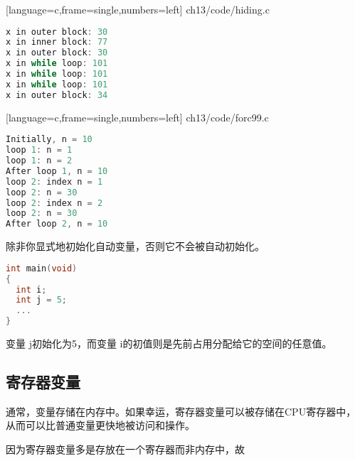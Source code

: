 \begin{frame}\ft{\subsecname}

[language=c,frame=single,numbers=left]
{ch13/code/hiding.c}
\end{frame}

\begin{frame}[fragile]\ft{\subsecname}
  \begin{lstlisting}[language=c,frame=single]
x in outer block: 30
x in inner block: 77
x in outer block: 30
x in while loop: 101
x in while loop: 101
x in while loop: 101
x in outer block: 34  
  \end{lstlisting}
\end{frame}

\begin{frame}\ft{\subsecname}

[language=c,frame=single,numbers=left]
{ch13/code/forc99.c}

\end{frame}

\begin{frame}[fragile]\ft{\subsecname}
  \begin{lstlisting}[language=c,frame=single]
Initially, n = 10
loop 1: n = 1
loop 1: n = 2
After loop 1, n = 10
loop 2: index n = 1
loop 2: n = 30
loop 2: index n = 2
loop 2: n = 30
After loop 2, n = 10
  \end{lstlisting}
\end{frame}

\begin{frame}[fragile]
除非你显式地初始化自动变量，否则它不会被自动初始化。
\begin{lstlisting}[language=c,frame=single]
int main(void)
{
  int i;
  int j = 5;
  ...
}  
\end{lstlisting}
变量{ j}初始化为5，而变量{ i}的初值则是先前占用分配给它的空间的任意值。
\end{frame}


\subsection{寄存器变量}
\begin{frame}[fragile]\ft{\subsecname}
通常，变量存储在内存中。如果幸运，寄存器变量可以被存储在CPU寄存器中，从而可以比普通变量更快地被访问和操作。
\vspace{0.1in}

因为寄存器变量多是存放在一个寄存器而非内存中，故 

\end{frame}

